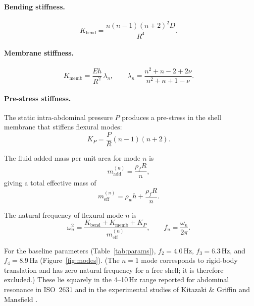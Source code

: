 \paragraph{Bending stiffness.}
\begin{equation}\label{eq:Kbend}
  K_\mathrm{bend} = \frac{n(n-1)(n+2)^2 D}{R^4}.
\end{equation}

\paragraph{Membrane stiffness.}
\begin{equation}\label{eq:Kmemb}
  K_\mathrm{memb} = \frac{Eh}{R^2}\,\lambda_n,
  \qquad \lambda_n = \frac{n^2 + n - 2 + 2\nu}{n^2 + n + 1 - \nu}.
\end{equation}

\paragraph{Pre-stress stiffness.}
The static intra-abdominal pressure $P$ produces a pre-stress in the
shell membrane that stiffens flexural modes:
\begin{equation}\label{eq:Kpre}
  K_P = \frac{P}{R}(n-1)(n+2).
\end{equation}

The fluid added mass per unit area for mode $n$ is
\begin{equation}\label{eq:madd}
  m_\mathrm{add}^{(n)} = \frac{\rho_f R}{n},
\end{equation}
giving a total effective mass of
\begin{equation}\label{eq:meff}
  m_\mathrm{eff}^{(n)} = \rho_w h + \frac{\rho_f R}{n}.
\end{equation}

The natural frequency of flexural mode $n$ is
\begin{equation}\label{eq:fn}
  \omega_n^2 = \frac{K_\mathrm{bend} + K_\mathrm{memb} + K_P}
                    {m_\mathrm{eff}^{(n)}},
  \qquad f_n = \frac{\omega_n}{2\pi}.
\end{equation}

For the baseline parameters (Table~\ref{tab:params}), $f_2 = 4.0$\,Hz,
$f_3 = 6.3$\,Hz, and $f_4 = 8.9$\,Hz (Figure~\ref{fig:modes}).  (The $n = 1$
mode corresponds to rigid-body translation and has zero natural frequency for
a free shell; it is therefore excluded.)  These lie squarely in the 4--10\,Hz
range reported for abdominal resonance in ISO~2631 \cite{iso2631} and in the
experimental studies of Kitazaki \& Griffin \cite{Kitazaki1998} and
Mansfield \cite{mansfield2005human}.

